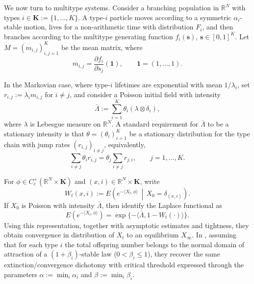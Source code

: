 \documentclass[reqno,final,11pt]{amsart}
\newcommand{\1}{\mathbbm{1}}
\renewcommand{\cite}{\citet}
\theoremstyle{plain}
\theoremstyle{definition}
\theoremstyle{remark}
\begin{document}
 
 We now turn to multitype systems. Consider a branching population in $\mathbb R^N$ with types
$i\in\mathbf K:=\{1,\dots,K\}$. A type-$i$ particle moves according to a symmetric
$\alpha_i$-stable motion, lives for a non-arithmetic time with distribution $F_i$, and then branches
according to the multitype generating function $f_i(\mathbf s)$, $\mathbf s\in[0,1]^K$. Let
$M=(m_{i,j})_{i,j=1}^K$ be the mean matrix, where
\[
m_{i,j}=\frac{\partial f_i}{\partial s_j}(\mathbf 1),
\qquad \mathbf 1=(1,\dots,1).
\]

In the Markovian case, where type-$i$ lifetimes are exponential with mean $1/\lambda_i$, set
$r_{i,j}:=\lambda_i m_{i,j}$ for $i\ne j$, and consider a Poisson initial field with intensity
\[
\bar\Lambda:=\sum_{i=1}^K \theta_i(\lambda\otimes\delta_i),
\]
where $\lambda$ is Lebesgue measure on $\mathbb R^N$. A standard requirement for
$\bar\Lambda$ to be a stationary intensity is that
$\theta=(\theta_i)_{i=1}^K$ be a stationary distribution for the type chain with jump rates
$(r_{i,j})_{i\ne j}$, equivalently,
\begin{equation}\label{estatio}
\sum_{i\ne j}\theta_i r_{i,j}
=
\theta_j\sum_{i\ne j} r_{j,i},
\qquad j=1,\dots,K.
\end{equation}

For $\phi\in C_c^+(\mathbb R^N\times\mathbf K)$ and
$(x,i)\in \mathbb R^N\times\mathbf K$, write
\[
W_t(x,i):=
E\!\left(
e^{-\langle X_t,\phi\rangle}
\,\middle|\, X_0=\delta_{(x,i)}
\right).
\]
If $X_0$ is Poisson with intensity $\bar \Lambda$, then \cite{GW,GRW} identify the Laplace
functional as
\begin{equation}\label{persistencea}
E\!\left(e^{-\langle X_t,\phi\rangle}\right)
=
\exp\{-\langle\bar\Lambda,1-W_t(\cdot)\rangle\}.
\end{equation}
Using this representation, together with asymptotic estimates and tightness, they obtain
convergence in distribution of $X_t$ to an equilibrium $X_\infty$. In \cite{Lopez1}, assuming that for each type $i$ the total offspring number belongs to the normal domain of attraction of a $(1+\beta_i)$-stable law ($0<\beta_i\le1$), they recover the same extinction/convergence dichotomy with critical threshold expressed through the parameters $\alpha:=\min_i\alpha_i$ and $\beta:=\min_i\beta_i$.
\end{document}
